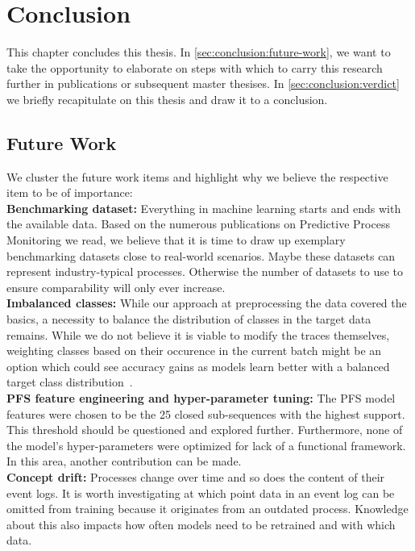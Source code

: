\chapter{Conclusion} \label{chap:conclusion}
This chapter concludes this thesis. In \autoref{sec:conclusion:future-work}, we want to take the opportunity to elaborate on steps with which to carry this research further in publications or subsequent master thesises. In \autoref{sec:conclusion:verdict} we briefly recapitulate on this thesis and draw it to a conclusion.

\section{Future Work} \label{sec:conclusion:future-work}
We cluster the future work items and highlight why we believe the respective item to be of importance:\\

\noindent\textbf{Benchmarking dataset:} Everything in machine learning starts and ends with the available data. Based on the numerous publications on Predictive Process Monitoring we read, we believe that it is time to draw up exemplary benchmarking datasets close to real-world scenarios. Maybe these datasets can represent industry-typical processes. Otherwise the number of datasets to use to ensure comparability will only ever increase.\\

\noindent\textbf{Imbalanced classes:} While our approach at preprocessing the data covered the basics, a necessity to balance the distribution of classes in the target data remains. While we do not believe it is viable to modify the traces themselves, weighting classes based on their occurence in the current batch might be an option which could see accuracy gains as models learn better with a balanced target class distribution~\cite{web:stackoverflow-keras-class-weights}.\\

\noindent\textbf{PFS feature engineering and hyper-parameter tuning:} The PFS model features  were chosen to be the 25 closed sub-sequences with the highest support. This threshold should be questioned and explored further. Furthermore, none of the model's hyper-parameters were optimized for lack of a functional framework. In this area, another contribution can be made.\\

\noindent\textbf{Concept drift:} Processes change over time and so does the content of their event logs. It is worth investigating at which point data in an event log can be omitted from training because it originates from an outdated process. Knowledge about this also impacts how often models need to be retrained and with which data.\\


